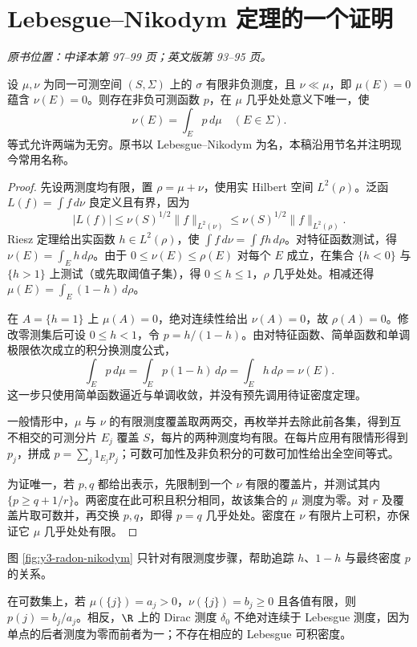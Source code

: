 \section{Lebesgue--Nikodym 定理的一个证明}\label{sec:yosida-03-08}
\noindent\textit{原书位置：中译本第 97--99 页；英文版第 93--95 页。}

\begin{theorem}\label{thm:y3-radon-nikodym}
设 $\mu,\nu$ 为同一可测空间 $(S,\Sigma)$ 上的 $\sigma$ 有限非负测度，且 $\nu\ll\mu$，即 $\mu(E)=0$ 蕴含 $\nu(E)=0$。则存在非负可测函数 $p$，在 $\mu$ 几乎处处意义下唯一，使
\[
 \nu(E)=\int_Ep\,d\mu\quad(E\in\Sigma).
\]
等式允许两端为无穷。原书以 Lebesgue--Nikodym 为名，本稿沿用节名并注明现今常用名称。
\end{theorem}
\begin{proof}
先设两测度均有限，置 $\rho=\mu+\nu$，使用实 Hilbert 空间 $L^2(\rho)$。泛函 $L(f)=\int f\,d\nu$ 良定义且有界，因为
\[
 |L(f)|\le\nu(S)^{1/2}\|f\|_{L^2(\nu)}
 \le\nu(S)^{1/2}\|f\|_{L^2(\rho)}.
\]
Riesz 定理给出实函数 $h\in L^2(\rho)$，使 $\int f\,d\nu=\int fh\,d\rho$。对特征函数测试，得 $\nu(E)=\int_Eh\,d\rho$。由于 $0\le\nu(E)\le\rho(E)$ 对每个 $E$ 成立，在集合 $\{h<0\}$ 与 $\{h>1\}$ 上测试（或先取阈值子集），得 $0\le h\le1$，$\rho$ 几乎处处。相减还得 $\mu(E)=\int_E(1-h)\,d\rho$。

在 $A=\{h=1\}$ 上 $\mu(A)=0$，绝对连续性给出 $\nu(A)=0$，故 $\rho(A)=0$。修改零测集后可设 $0\le h<1$，令 $p=h/(1-h)$。由对特征函数、简单函数和单调极限依次成立的积分换测度公式，
\[
 \int_Ep\,d\mu=\int_Ep(1-h)\,d\rho
 =\int_Eh\,d\rho=\nu(E).
\]
这一步只使用简单函数逼近与单调收敛，并没有预先调用待证密度定理。

一般情形中，$\mu$ 与 $\nu$ 的有限测度覆盖取两两交，再枚举并去除此前各集，得到互不相交的可测分片 $E_j$ 覆盖 $S$，每片的两种测度均有限。在每片应用有限情形得到 $p_j$，拼成 $p=\sum_j1_{E_j}p_j$；可数可加性及非负积分的可数可加性给出全空间等式。

为证唯一，若 $p,q$ 都给出表示，先限制到一个 $\nu$ 有限的覆盖片，并测试其内 $\{p\ge q+1/r\}$。两密度在此可积且积分相同，故该集合的 $\mu$ 测度为零。对 $r$ 及覆盖片取可数并，再交换 $p,q$，即得 $p=q$ 几乎处处。密度在 $\nu$ 有限片上可积，亦保证它 $\mu$ 几乎处处有限。
\end{proof}

图 \ref{fig:y3-radon-nikodym} 只针对有限测度步骤，帮助追踪 $h$、$1-h$ 与最终密度 $p$ 的关系。



\begin{example}[原子与绝对连续性]
在可数集上，若 $\mu(\{j\})=a_j>0$，$\nu(\{j\})=b_j\ge0$ 且各值有限，则 $p(j)=b_j/a_j$。相反，$\R$ 上的 Dirac 测度 $\delta_0$ 不绝对连续于 Lebesgue 测度，因为单点的后者测度为零而前者为一；不存在相应的 Lebesgue 可积密度。
\end{example}

